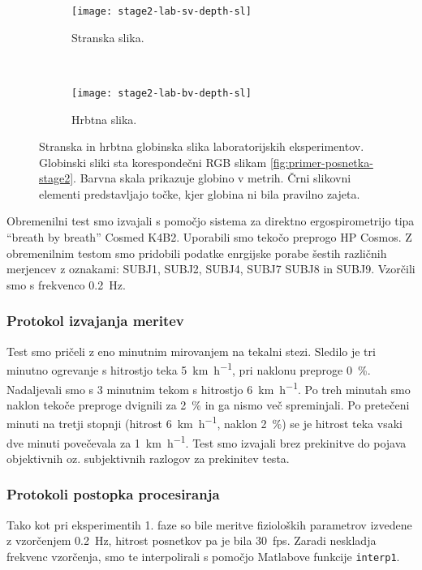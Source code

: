 \begin{figure}[!htb]
	\centering
	\begin{subfigure}[t]{0.45\columnwidth}
		\centering
		\texttt{[image: stage2-lab-sv-depth-sl]}
		\caption{Stranska slika.}
	\end{subfigure}
	~
	\begin{subfigure}[t]{0.45\columnwidth}
		\centering
		\texttt{[image: stage2-lab-bv-depth-sl]}
		\caption{Hrbtna slika.}
	\end{subfigure}
	\caption[Stranska in hrbtna globinska slika laboratorijskih eksperimentov]{Stranska in hrbtna globinska slika laboratorijskih eksperimentov. Globinski sliki sta korespondečni RGB slikam \ref{fig:primer-posnetka-stage2}. Barvna skala prikazuje globino v metrih. Črni slikovni elementi predstavljajo točke, kjer globina ni bila pravilno zajeta.}
	\label{fig:stage2-lab-of-depth}
\end{figure}

Obremenilni test smo izvajali s pomočjo sistema za direktno ergospirometrijo tipa ``breath  by breath'' Cosmed K4B2. Uporabili smo  tekočo  preprogo HP Cosmos. Z obremenilnim testom smo pridobili podatke enrgijske porabe šestih različnih merjencev z oznakami: SUBJ1, SUBJ2, SUBJ4, SUBJ7 SUBJ8 in SUBJ9. Vzorčili smo s frekvenco \SI{0.2}{\hertz}.

\subsubsection{Protokol izvajanja meritev}
Test smo pričeli z eno minutnim mirovanjem na tekalni stezi. Sledilo je tri minutno ogrevanje s hitrostjo teka \SI{5}{\km\per\hour}, pri naklonu preproge \SI{0}{\%}. Nadaljevali smo s 3 minutnim tekom s hitrostjo \SI{6}{\km\per\hour}. Po treh minutah smo naklon tekoče preproge  dvignili za \SI{2}{\%} in ga nismo več spreminjali. Po pretečeni minuti na  tretji stopnji (hitrost \SI{6}{\km\per\hour}, naklon \SI{2}{\%}) se je hitrost teka vsaki dve  minuti  povečevala za \SI{1}{\km\per\hour}. Test smo izvajali brez prekinitve do pojava objektivnih oz. subjektivnih razlogov za prekinitev testa. 
 

\subsubsection{Protokoli postopka procesiranja}
Tako kot pri eksperimentih 1. faze so bile  meritve fizioloških parametrov izvedene z vzorčenjem \SI{0.2}{\hertz}, hitrost posnetkov pa je bila \SI{30}{fps}. Zaradi neskladja frekvenc vzorčenja, smo te interpolirali s pomočjo Matlabove funkcije \texttt{interp1}.

